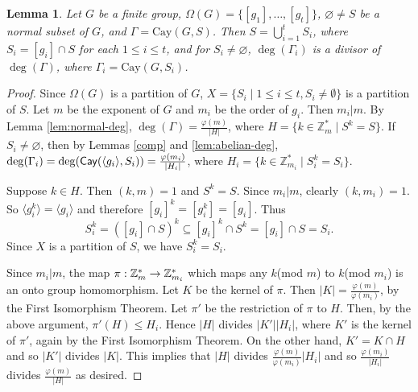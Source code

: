 \documentclass[12pt,a4paper]{article}
\newtheorem{lem}[thm]{Lemma}
\def \leq {\leqslant}
\def\Cay{{\sf Cay}} \def\Ker{{\sf Ker}}
\begin{document}
	\begin{lem}\label{union}
		Let $G$ be a finite group, $\Omega(G)=\{[g_1],\ldots,[g_t]\}$, $\varnothing\neq S$ be a normal  subset of $G$, and $\Gamma=\mathrm{Cay}(G,S)$. Then $S=\bigcup_{i=1}^t S_i$, where $S_i=[g_i]\cap S$ for each $1\leq i\leq t$, and for $S_i\neq \varnothing$, $\deg(\Gamma_i)$ is a divisor of $\deg(\Gamma)$, where $\Gamma_i=\mathrm{Cay}(G,S_i)$.
	\end{lem}
	\begin{proof}
		Since $\Omega(G)$ is a partition of $G$, $X=\{S_i\mid 1\leq i\leq t, S_i\neq\emptyset\}$ is a partition of $S$.
		Let $m$ be the exponent of $G$ and $m_i$ be the order of $g_i$. Then $m_i|m$.
		By Lemma \ref{lem:normal-deg}, $\deg(\Gamma)=\frac{\varphi(m)}{|H|}$, where $H=\{k\in\mathbb Z_m^*\mid S^k=S\}$. If $S_i\neq \varnothing$, then by Lemmas \ref{comp} and \ref{lem:abelian-deg}, $\deg(\Gamma_i)=\deg(\Cay(\langle g_i\rangle,S_i))=\frac{\varphi(m_i)}{|H_i|}$, where $H_i=\{k\in\mathbb Z_{m_i}^*\mid S_i^k=S_i\}$.
	
		
		Suppose $k\in H$. Then $(k,m)=1$ and $S^k=S$. Since $m_i|m$, clearly $(k,m_i)=1$. So $\langle g_i^k \rangle=\langle g_i\rangle$ and therefore $[g_i]^k=[g_i^k]=[g_i]$. Thus
	\[S_i^k=([g_i]\cap S)^k\subseteq [g_i]^k\cap S^k=[g_i]\cap S=S_i.\]
	 Since $X$ is a partition of $S$, we have $S_i^k=S_i$.
	 
	  Since $m_i|m$, the map $\pi:\Bbb Z_m^*\rightarrow\Bbb Z_{m_i}^*$ which maps any $k$(mod $m$) to $k$(mod $m_i$) is an onto group homomorphism. Let $K$ be the kernel of $\pi$. Then $|K|=\frac{\varphi(m)}{\varphi(m_i)}$, by the First Isomorphism Theorem. Let $\pi'$ be the restriction of $\pi$ to $H$. Then, by the above argument, $\pi'(H)\leq H_i$. Hence
	  $|H|$ divides $|K'||H_i|$, where $K'$ is the kernel of $\pi'$, again by the First Isomorphism Theorem. On the other hand, $K'=K\cap H$ and so $|K'|$ divides $|K|$. This implies that 
	  $|H|$ divides $\frac{\varphi(m)}{\varphi(m_i)}|H_i|$ and so $\frac{\varphi(m_i)}{|H_i|}$ divides $\frac{\varphi(m)}{|H|}$ as desired.
	\end{proof}
	
	
	
	
	
\end{document}
